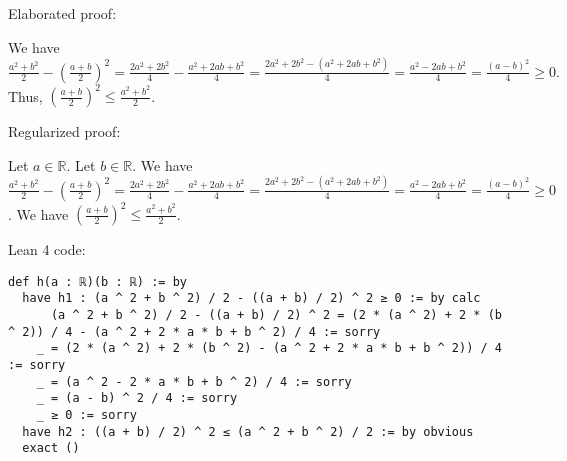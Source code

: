 \documentclass{article}
\begin{document}
Elaborated proof:
\begin{tcolorbox}[colback=green!10, width=\linewidth]
We have
$ \frac{a^2+b^2}{2} - \left(\frac{a+b}{2}\right)^2 = \frac{2a^2+2b^2}{4} - \frac{a^2+2ab+b^2}{4} = \frac{2a^2+2b^2-(a^2+2ab+b^2)}{4} = \frac{a^2-2ab+b^2}{4} = \frac{(a-b)^2}{4} \ge 0. $
Thus, $\left(\frac{a+b}{2}\right)^2 \leq \frac{a^2+b^2}{2}$.
\end{tcolorbox}

Regularized proof:
\begin{tcolorbox}[colback=red!10, width=\linewidth]
Let $a\in\mathbb{R}$.
Let $b\in\mathbb{R}$.
We have $\frac{a^2+b^2}{2} - {\left(\frac{a+b}{2}\right)}^2 = \frac{2a^2+2b^2}{4} - \frac{a^2+2ab+b^2}{4} = \frac{2a^2+2b^2-(a^2+2ab+b^2)}{4} = \frac{a^2-2ab+b^2}{4} = \frac{{(a-b)}^2}{4} \ge 0$.
We have ${\left(\frac{a+b}{2}\right)}^2 \leq \frac{a^2+b^2}{2}$.
\end{tcolorbox}

Lean 4 code:
\begin{tcolorbox}[colback=white!10, width=\linewidth]
\begin{lstlisting}[language=Lean4]
def h(a : ℝ)(b : ℝ) := by
  have h1 : (a ^ 2 + b ^ 2) / 2 - ((a + b) / 2) ^ 2 ≥ 0 := by calc
      (a ^ 2 + b ^ 2) / 2 - ((a + b) / 2) ^ 2 = (2 * (a ^ 2) + 2 * (b ^ 2)) / 4 - (a ^ 2 + 2 * a * b + b ^ 2) / 4 := sorry
    _ = (2 * (a ^ 2) + 2 * (b ^ 2) - (a ^ 2 + 2 * a * b + b ^ 2)) / 4 := sorry
    _ = (a ^ 2 - 2 * a * b + b ^ 2) / 4 := sorry
    _ = (a - b) ^ 2 / 4 := sorry
    _ ≥ 0 := sorry
  have h2 : ((a + b) / 2) ^ 2 ≤ (a ^ 2 + b ^ 2) / 2 := by obvious
  exact ()
\end{lstlisting}
\end{tcolorbox}
\end{document}
